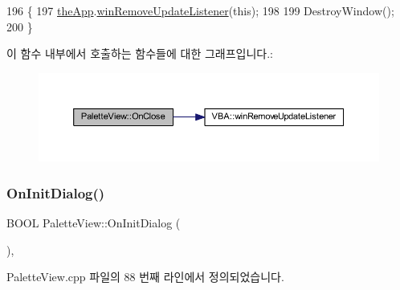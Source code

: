 \begin{DoxyCode}
196 \{
197   \mbox{\hyperlink{_v_b_a_8cpp_a8095a9d06b37a7efe3723f3218ad8fb3}{theApp}}.\mbox{\hyperlink{class_v_b_a_a2d31a0656df2230310aa8dc9e3a735d3}{winRemoveUpdateListener}}(\textcolor{keyword}{this});
198   
199   DestroyWindow();
200 \}
\end{DoxyCode}
이 함수 내부에서 호출하는 함수들에 대한 그래프입니다.\+:
\nopagebreak
\begin{figure}[H]
\begin{center}
\leavevmode
\includegraphics[width=350pt]{class_palette_view_a58ce1d32d85fc8ee06f4e97948684cea_cgraph}
\end{center}
\end{figure}
\mbox{\label{class_palette_view_a5b6b2d948cd58f3fe450ffd7322bc9f7}} 
\subsubsection{\texorpdfstring{On\+Init\+Dialog()}{OnInitDialog()}}
{\footnotesize\ttfamily B\+O\+OL Palette\+View\+::\+On\+Init\+Dialog (\begin{DoxyParamCaption}{ }\end{DoxyParamCaption})\hspace{0.3cm}{\ttfamily [protected]}, {\ttfamily [virtual]}}



Palette\+View.\+cpp 파일의 88 번째 라인에서 정의되었습니다.


